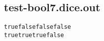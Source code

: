 \subsection{test-bool7.dice.out}
\begin{verbatim}
truefalsefalsefalse
truetruetruefalse
\end{verbatim}